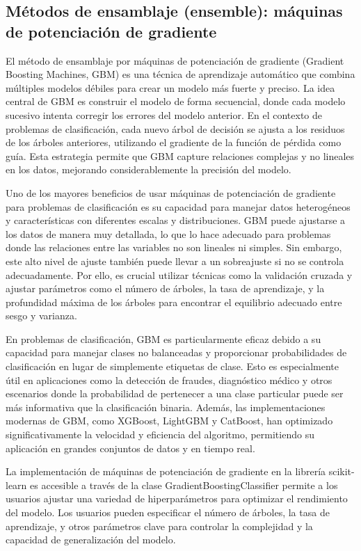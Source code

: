 \subsection{Métodos de ensamblaje (ensemble): máquinas de potenciación de gradiente}

El método de ensamblaje por máquinas de potenciación de gradiente (Gradient Boosting Machines, GBM) es una técnica de aprendizaje automático que combina múltiples modelos débiles para crear un modelo más fuerte y preciso. La idea central de GBM es construir el modelo de forma secuencial, donde cada modelo sucesivo intenta corregir los errores del modelo anterior. En el contexto de problemas de clasificación, cada nuevo árbol de decisión se ajusta a los residuos de los árboles anteriores, utilizando el gradiente de la función de pérdida como guía. Esta estrategia permite que GBM capture relaciones complejas y no lineales en los datos, mejorando considerablemente la precisión del modelo.

Uno de los mayores beneficios de usar máquinas de potenciación de gradiente para problemas de clasificación es su capacidad para manejar datos heterogéneos y características con diferentes escalas y distribuciones. GBM puede ajustarse a los datos de manera muy detallada, lo que lo hace adecuado para problemas donde las relaciones entre las variables no son lineales ni simples. Sin embargo, este alto nivel de ajuste también puede llevar a un sobreajuste si no se controla adecuadamente. Por ello, es crucial utilizar técnicas como la validación cruzada y ajustar parámetros como el número de árboles, la tasa de aprendizaje, y la profundidad máxima de los árboles para encontrar el equilibrio adecuado entre sesgo y varianza.

En problemas de clasificación, GBM es particularmente eficaz debido a su capacidad para manejar clases no balanceadas y proporcionar probabilidades de clasificación en lugar de simplemente etiquetas de clase. Esto es especialmente útil en aplicaciones como la detección de fraudes, diagnóstico médico y otros escenarios donde la probabilidad de pertenecer a una clase particular puede ser más informativa que la clasificación binaria. Además, las implementaciones modernas de GBM, como XGBoost, LightGBM y CatBoost, han optimizado significativamente la velocidad y eficiencia del algoritmo, permitiendo su aplicación en grandes conjuntos de datos y en tiempo real.

La implementación de máquinas de potenciación de gradiente en la librería scikit-learn es accesible a través de la clase GradientBoostingClassifier \cite{sk-gradient-boost} permite a los usuarios ajustar una variedad de hiperparámetros para optimizar el rendimiento del modelo. Los usuarios pueden especificar el número de árboles, la tasa de aprendizaje, y otros parámetros clave para controlar la complejidad y la capacidad de generalización del modelo.

